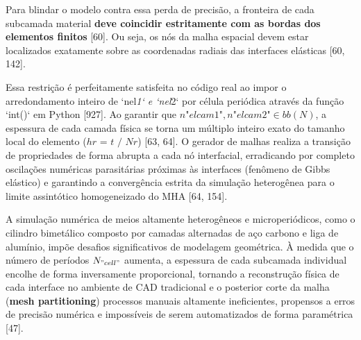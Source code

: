Para blindar o modelo contra essa perda de precisão, a fronteira de cada subcamada material \textbf{deve coincidir estritamente com as bordas dos elementos finitos} [60]. Ou seja, os nós da malha espacial devem estar localizados exatamente sobre as coordenadas radiais das interfaces elásticas [60, 142].

Essa restrição é perfeitamente satisfeita no código real ao impor o arredondamento inteiro de `nel\textit{1` e `nel}2` por célula periódica através da função `int()` em Python [927]. Ao garantir que $n\textit{{"el}cam1"}, n\textit{{"el}cam2"} \in bb(N)$, a espessura de cada camada física se torna um múltiplo inteiro exato do tamanho local do elemento ($h\textit{r = t / N}r$) [63, 64]. O gerador de malhas realiza a transição de propriedades de forma abrupta a cada nó interfacial, erradicando por completo oscilações numéricas parasitárias próximas às interfaces (fenômeno de Gibbs elástico) e garantindo a convergência estrita da simulação heterogênea para o limite assintótico homogeneizado do MHA [64, 154].

A simulação numérica de meios altamente heterogêneos e microperiódicos, como o cilindro bimetálico composto por camadas alternadas de aço carbono e liga de alumínio, impõe desafios significativos de modelagem geométrica. À medida que o número de períodos $N_{"cell"}$ aumenta, a espessura de cada subcamada individual encolhe de forma inversamente proporcional, tornando a reconstrução física de cada interface no ambiente de CAD tradicional e o posterior corte da malha (\textbf{mesh partitioning}) processos manuais altamente ineficientes, propensos a erros de precisão numérica e impossíveis de serem automatizados de forma paramétrica [47].

